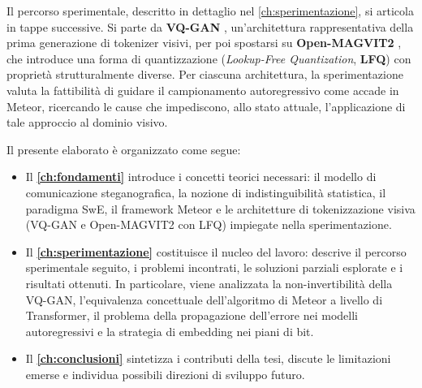 Il percorso sperimentale, descritto in dettaglio nel \autoref{ch:sperimentazione}, si articola in tappe successive. Si parte da \textbf{VQ-GAN} \cite{esser-2020}, un'architettura rappresentativa della prima generazione di tokenizer visivi, per poi spostarsi su \textbf{Open-MAGVIT2} \cite{luo-2025}, che introduce una forma di quantizzazione (\emph{Lookup-Free Quantization}, \textbf{LFQ}) con proprietà strutturalmente diverse. Per ciascuna architettura, la sperimentazione valuta la fattibilità di guidare il campionamento autoregressivo come accade in Meteor, ricercando le cause che impediscono, allo stato attuale, l'applicazione di tale approccio al dominio visivo.

\bigskip

Il presente elaborato è organizzato come segue:
\begin{itemize}
	\item Il \textbf{\autoref{ch:fondamenti}} introduce i concetti teorici necessari: il modello di comunicazione steganografica, la nozione di indistinguibilità statistica, il paradigma SwE, il framework Meteor e le architetture di tokenizzazione visiva (VQ-GAN e Open-MAGVIT2 con LFQ) impiegate nella sperimentazione.

	\item Il \textbf{\autoref{ch:sperimentazione}} costituisce il nucleo del lavoro: descrive il percorso sperimentale seguito, i problemi incontrati, le soluzioni parziali esplorate e i risultati ottenuti. In particolare, viene analizzata la non-invertibilità della VQ-GAN, l'equivalenza concettuale dell'algoritmo di Meteor a livello di Transformer, il problema della propagazione dell'errore nei modelli autoregressivi e la strategia di embedding nei piani di bit.

	\item Il \textbf{\autoref{ch:conclusioni}} sintetizza i contributi della tesi, discute le limitazioni emerse e individua possibili direzioni di sviluppo futuro.
\end{itemize}